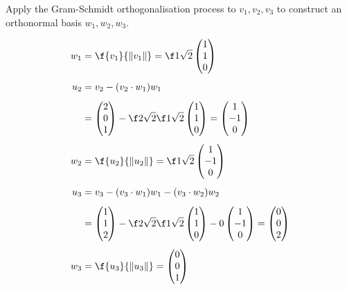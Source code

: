 \documentclass[a4paper]{article}
\begin{document}
\begin{questionbody}
Apply the Gram-Schmidt orthogonalisation process to $v_1, v_2, v_3$ to construct an orthonormal basis $w_1, w_2, w_3$.
\end{questionbody}

\begin{align*}
w_1 &= \f{v_1}{\| v_1 \|} = \f1{\sqrt 2} \begin{pmatrix}1\\ 1\\ 0\end{pmatrix}\\[1ex]
u_2 &= v_2 - (v_2 \cdot w_1) w_1\\[1ex]
&= \begin{pmatrix}2\\ 0\\ 1\end{pmatrix} - \f2{\sqrt2} \f1{\sqrt2} \begin{pmatrix}1\\ 1\\ 0\end{pmatrix} = \begin{pmatrix}1\\ -1\\ 0\end{pmatrix}\\[1ex]
w_2 &= \f{u_2}{\| u_2 \|} = \f1{\sqrt2} \begin{pmatrix}1\\ -1\\ 0\end{pmatrix}\\[1ex]
u_3 &= v_3 - (v_3 \cdot w_1) w_1 - (v_3 \cdot w_2) w_2\\[1ex]
&= \begin{pmatrix}1\\ 1\\ 2\end{pmatrix} - \f2{\sqrt2} \f1{\sqrt2} \begin{pmatrix}1\\ 1\\ 0\end{pmatrix} - 0 \begin{pmatrix}1\\ -1\\ 0\end{pmatrix} = \begin{pmatrix}0\\ 0\\ 2\end{pmatrix}\\[1ex]
w_3 &= \f{u_3}{\| u_3 \|} = \begin{pmatrix}0\\ 0\\ 1\end{pmatrix}
\end{align*}
\end{document}
